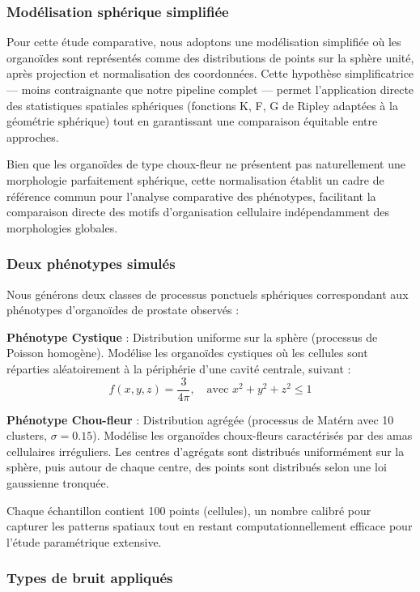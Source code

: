 \subsubsection{Modélisation sphérique simplifiée}

Pour cette étude comparative, nous adoptons une modélisation simplifiée où les organoïdes sont représentés comme des distributions de points sur la sphère unité, après projection et normalisation des coordonnées. Cette hypothèse simplificatrice — moins contraignante que notre pipeline complet — permet l'application directe des statistiques spatiales sphériques (fonctions K, F, G de Ripley adaptées à la géométrie sphérique) tout en garantissant une comparaison équitable entre approches.

Bien que les organoïdes de type choux-fleur ne présentent pas naturellement une morphologie parfaitement sphérique, cette normalisation établit un cadre de référence commun pour l'analyse comparative des phénotypes, facilitant la comparaison directe des motifs d'organisation cellulaire indépendamment des morphologies globales.

\subsubsection{Deux phénotypes simulés}

Nous générons deux classes de processus ponctuels sphériques correspondant aux phénotypes d'organoïdes de prostate observés :

\textbf{Phénotype Cystique} : Distribution uniforme sur la sphère (processus de Poisson homogène). Modélise les organoïdes cystiques où les cellules sont réparties aléatoirement à la périphérie d'une cavité centrale, suivant :
\[
f(x,y,z) = \frac{3}{4\pi}, \quad \text{avec } x^2+y^2+z^2 \leq 1
\]

\textbf{Phénotype Chou-fleur} : Distribution agrégée (processus de Matérn avec 10 clusters, $\sigma = 0.15$). Modélise les organoïdes choux-fleurs caractérisés par des amas cellulaires irréguliers. Les centres d'agrégats sont distribués uniformément sur la sphère, puis autour de chaque centre, des points sont distribués selon une loi gaussienne tronquée.

Chaque échantillon contient 100 points (cellules), un nombre calibré pour capturer les patterns spatiaux tout en restant computationnellement efficace pour l'étude paramétrique extensive.

\subsubsection{Types de bruit appliqués}

